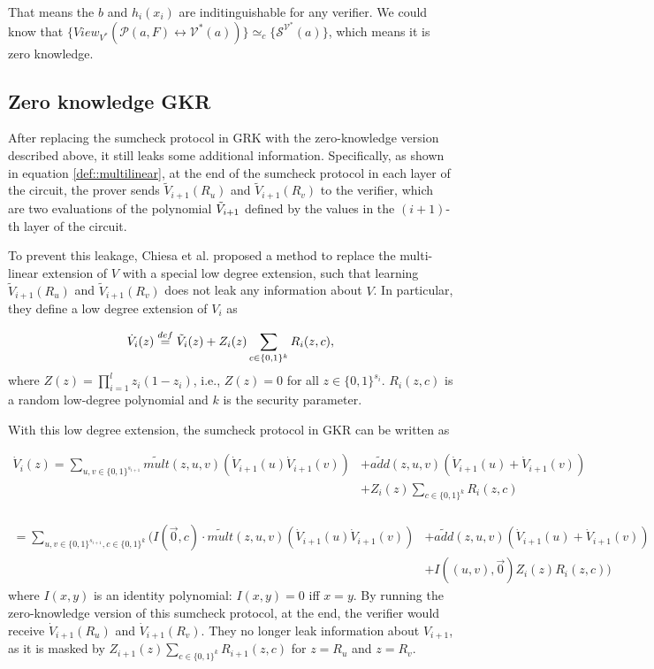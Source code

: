 That means the $b$ and $h_i(x_i)$ are inditinguishable for any verifier. We could know that $\{View_{V^*}(\mathcal{P}(a, F) \leftrightarrow \mathcal{V^*}(a))\} \simeq_{c} \{\mathcal{S}^{\mathcal{V^*}}(a)\}$, which means it is zero knowledge.\\


\subsection{Zero knowledge GKR}

After replacing the sumcheck protocol in GRK with the zero-knowledge version described above, it still leaks some additional information. Specifically, as shown in equation \ref{def::multilinear}, at the end of the sumcheck protocol in each layer of the circuit, the prover sends $\tilde{V}_{i+1}(R_u)$ and $\tilde{V}_{i+1}(R_v)$ to the verifier, which are two evaluations of the polynomial $\tilde{V}_{i+1}$ defined by the values in the $(i+1)$-th layer of the circuit. 

To prevent this leakage, Chiesa et al.\cite{zksumcheck} proposed a method to replace the multi-linear extension of $V$ with a special low degree extension, such that learning $\tilde{V}_{i+1}(R_u)$ and $\tilde{V}_{i+1}(R_v)$ does not leak any information about $V$. In particular, they define a low degree extension of $V_i$ as 

\[
\dot{V}_{i}(z) \overset{def}{=} \tilde{V}_i(z)+Z_i(z)\sum\limits_{c \in \{0, 1\}^k}R_i(z, c),
\]
where $Z(z) = \prod_{i=1}^l z_i(1-z_i)$, i.e., $Z(z)=0$ for all $z\in\{0, 1\}^{s_i}$. $R_i(z,c)$ is a random low-degree polynomial and $k$ is the security parameter. 

With this low degree extension, the sumcheck protocol in GKR can be written as

\begin{align*}
\dot{V}_{i}(z)=\sum_{u, v\in \{0,1\}^{s_{i+1}}}\tilde{mult}(z, u, v)(\dot{V}_{i+1}(u)\dot{V}_{i+1}(v))&+\tilde{add}(z,u,v)(\dot{V}_{i+1}(u)+\dot{V}_{i+1}(v))\\
&+ Z_i(z)\sum\limits_{c \in \{0, 1\}^k}R_i(z, c)\\
\end{align*}

\begin{align*}
=\sum_{u, v\in \{0,1\}^{s_{i+1}},c \in \{0, 1\}^k}(I(\vec{0},c) \cdot \tilde{mult}(z, u, v)(\dot{V}_{i+1}(u)\dot{V}_{i+1}(v))&+\tilde{add}(z,u,v)(\dot{V}_{i+1}(u)+\dot{V}_{i+1}(v))\\
&+ I((u, v), \vec{0})Z_i(z)R_i(z, c))
\end{align*}
where $I(x,y)$ is an identity polynomial: $I(x,y) = 0$ iff $x=y$. By running the zero-knowledge version of this sumcheck protocol, at the end, the verifier would receive $\dot{V}_{i+1}(R_u)$ and $\dot{V}_{i+1}(R_v)$. They no longer leak information about $V_{i+1}$, as it is masked by $Z_{i+1}(z)\sum\limits_{c \in \{0, 1\}^k}R_{i+1}(z, c)$ for $z=R_u$ and $z=R_v$.

